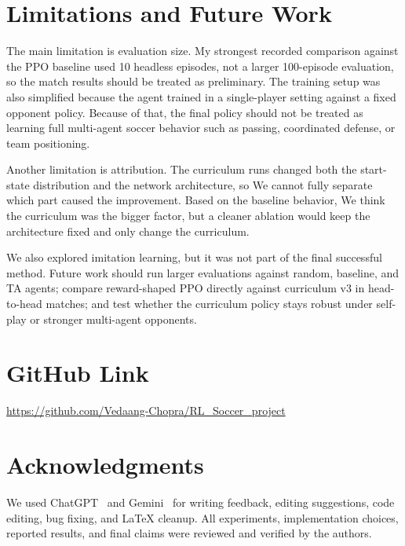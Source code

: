 \documentclass{article}
\begin{document}
\section{Limitations and Future Work}

The main limitation is evaluation size. My strongest recorded comparison against the PPO baseline used 10 headless episodes, not a larger 100-episode evaluation, so the match results should be treated as preliminary. The training setup was also simplified because the agent trained in a single-player setting against a fixed opponent policy. Because of that, the final policy should not be treated as learning full multi-agent soccer behavior such as passing, coordinated defense, or team positioning.

Another limitation is attribution. The curriculum runs changed both the start-state distribution and the network architecture, so We cannot fully separate which part caused the improvement. Based on the baseline behavior, We think the curriculum was the bigger factor, but a cleaner ablation would keep the architecture fixed and only change the curriculum.

We also explored imitation learning, but it was not part of the final successful method. Future work should run larger evaluations against random, baseline, and TA agents; compare reward-shaped PPO directly against curriculum v3 in head-to-head matches; and test whether the curriculum policy stays robust under self-play or stronger multi-agent opponents.


\section{GitHub Link}
\url{https://github.com/Vedaang-Chopra/RL_Soccer_project}

\section*{Acknowledgments}

We used ChatGPT~\citep{openai2026chatgpt} and Gemini~\citep{google2026gemini} for writing feedback, editing suggestions, code editing, bug fixing, and \LaTeX{} cleanup. All experiments, implementation choices, reported results, and final claims were reviewed and verified by the authors.


\end{document}
